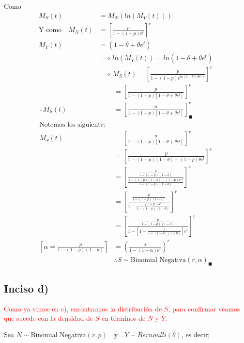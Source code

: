 \documentclass[
]{article}
\begin{document}
Como \begin{align*}
M_{S}(t) &= M_{N} (ln(M_{Y}(t)))\\
\text{Y como} \quad M_{N}(t) &= \left[\frac{p}{1 - (1 - p)e^{t}}\right]^{r}\\
              M_{Y}(t) &= (1 - \theta + \theta e^{t})\\
              &\implies ln(M_{Y}(t)) = ln(1 - \theta + \theta e^{t})\\
              &\implies M_{S}(t) = \left[\frac{p}{1 - (1 - p) e^{ln(1 - \theta + \theta e^{t})}}\right]^{r}
\end{align*} \begin{align*}
              &= \left[\frac{p}{1 - (1 - p) \left[1 - \theta + \theta e^{t}\right]}\right]^{r}\\
\therefore M_{S}(t) &= \left[\frac{p}{1 - (1 - p) \left[1 - \theta + \theta e^{t}\right]}\right]^{r}_\blacksquare\\
\text{Notemos los siguiente:}\\
M_{S}(t) &= \left[\frac{p}{1 - (1 - p) \left[1 - \theta + \theta e^{t}\right]}\right]^{r}\\
&= \left[\frac{p}{1 - (1 - p)(1 - \theta) - (1 - p)\theta e^{t}}\right]^{r}\\
&= \left[\frac{\frac{p}{1 - (1 - p)(1 - \theta)}}{\frac{1 - (1 - p)(1 - \theta) - (1 - p)\theta e^{t}}{1 - (1 - p)(1 - \theta)}}\right]^{r}\\
&= \left[\frac{\frac{p}{1 - (1 - p)(1 - \theta)}}{1 - \frac{(1 - p)\theta e^{t}}{1 - (1 - p)(1 - \theta)}}\right]^{r}\\
&= \left[\frac{\frac{p}{1 - (1 - p)(1 - \theta)}}{1 - \left[1 - \frac{p}{1 - (1 - p)(1 - \theta)}\right]e^{t}}\right]^{r}\\
\left[\alpha = \frac{p}{1 - (1 - p)(1 - \theta)}\right] &= \left(\frac{\alpha}{1 - (1 - \alpha)e^{t}}\right)^{r}\\
&\therefore S \sim \text{Binomial Negativa}(r, \alpha)_\blacksquare
\end{align*}

\hypertarget{inciso-d-1}{%
\subsection{Inciso d)}\label{inciso-d-1}}

\textcolor{red}{Como ya vimos en c), encontramos la distribución de $S$, para confirmar veamos que sucede con la densidad de $S$ en términos de $N$ y $Y$.}

Sea
\(N \sim \text{Binomial Negativa} (r,p) \quad \text{y}\quad Y \sim Bernoulli(\theta)\),
es decir;
\end{document}
